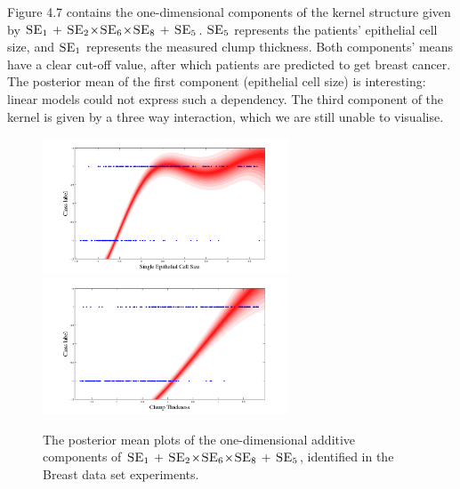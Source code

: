 \documentclass[a4paper,12pt ]{report}
\newcommand{\kerntimes}{ \! \times \!}
\newcommand{\kernplus}{ \, + \,}
\begin{document}
Figure 4.7 contains the one-dimensional components of the kernel structure given by $ \SE_1 \kernplus  \SE_2 \kerntimes \SE_6 \kerntimes \SE_8 \kernplus \SE_5 $. $\textsc{SE}_5$ represents the patients' epithelial cell size, and $\textsc{SE}_1$ represents the measured clump thickness. Both components' means have a clear cut-off value, after which patients are predicted to get breast cancer. The posterior mean of the first component (epithelial cell size) is interesting: linear models could not express such a dependency. The third component of the kernel is given by a three way interaction, which we are still unable to visualise. \\

\begin{figure} [h]

\caption{The posterior mean plots of the one-dimensional additive components of $\SE_1 \kernplus  \SE_2 \kerntimes \SE_6 \kerntimes \SE_8 \kernplus \SE_5 $, identified in the Breast data set experiments.}

\begin{center}


\includegraphics[trim=1.5cm 0cm 1.5cm 0cm, width=0.65\textwidth]{figures/breast/cellsize.png} %
\includegraphics[trim=1.5cm 0cm 1.5cm 0cm, width=0.65\textwidth]{figures/breast/clump.png} %


\end{center}


\end{figure}
\end{document}
